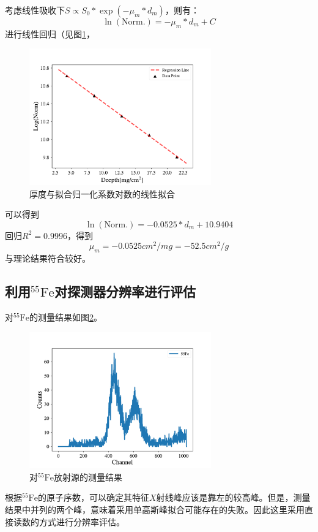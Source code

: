 \documentclass{article}
\begin{document}
    考虑线性吸收下$S\propto S_0*\exp(-\mu_m*d_m)$，则有：
    \begin{equation}
        \ln{(\text{Norm.})} = -\mu_m*d_m+C
    \end{equation}
    进行线性回归（见图\ref{fig:LinearReg2}，
    \begin{figure}[htbp]
        \centering
        \includegraphics[width=0.7\textwidth]{../plot/LinearReg2.pdf}
        \caption{厚度与拟合归一化系数对数的线性拟合\label{fig:LinearReg2}}
    \end{figure}
    可以得到
    \begin{equation}
        \ln{(\text{Norm.})} = -0.0525*d_m+10.9404 
    \end{equation}
    回归$R^2 = 0.9996$，得到
    \begin{equation}
        \mu_m = -0.0525\si{cm^2\per mg} = -52.5\si{cm^2\per g}
    \end{equation}
    与理论结果符合较好。
    \subsection{利用$^{55}\text{Fe}$对探测器分辨率进行评估}
    对$^{55}\text{Fe}$的测量结果如图\ref{fig:55Fe}。
    \begin{figure}
        \centering
        \includegraphics[width=0.7\textwidth]{../plot/55Fe.pdf}
        \caption{对$^{55}\text{Fe}$放射源的测量结果\label{fig:55Fe}}
    \end{figure}
    根据$^{55}\text{Fe}$的原子序数，可以确定其特征$X$射线峰应该是靠左的较高峰。但是，测量结果中并列的两个峰，意味着采用单高斯峰拟合可能存在的失败。因此这里采用直接读数的方式进行分辨率评估。
\end{document}
